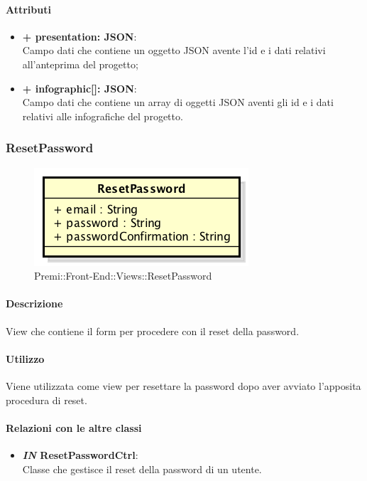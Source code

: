 	\paragraph{Attributi}
	\begin{itemize}
		\item \textbf{+ presentation: JSON}:\\
			Campo dati che contiene un oggetto JSON avente l'id e i dati relativi all'anteprima del progetto;
		\item \textbf{+ infographic[]: JSON}:\\
			Campo dati che contiene un array di oggetti JSON aventi gli id e i dati relativi alle infografiche del progetto.
	\end{itemize}
\newpage
	
	
\subsubsection{ResetPassword}
	\begin{figure}[h]
		\centering
		\includegraphics[width=0.3\linewidth]{img/premi_front_end_views_resetpassword}
		\caption[Premi::Front-End::Views::ResetPassword]{Premi::Front-End::Views::ResetPassword}
	\end{figure}
	
	\paragraph{Descrizione}
	View che contiene il form per procedere con il reset della password.
	
	\paragraph{Utilizzo}
	Viene utilizzata come view per resettare la password dopo aver avviato l'apposita procedura di reset.
	
	\paragraph{Relazioni con le altre classi}
	\begin{itemize}
		\item \textbf{\textit{IN} ResetPasswordCtrl}:\\
		Classe che gestisce il reset della password di un utente.
	\end{itemize}
	
